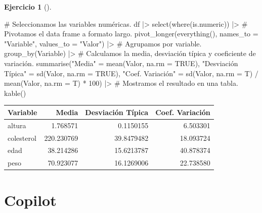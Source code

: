 \documentclass[
  a4paper,
]{scrreport}
\newenvironment{Shaded}{\begin{snugshade}}{\end{snugshade}}
\newcommand{\AttributeTok}[1]{\textcolor[rgb]{0.40,0.45,0.13}{#1}}
\newcommand{\CommentTok}[1]{\textcolor[rgb]{0.37,0.37,0.37}{#1}}
\newcommand{\ConstantTok}[1]{\textcolor[rgb]{0.56,0.35,0.01}{#1}}
\newcommand{\DecValTok}[1]{\textcolor[rgb]{0.68,0.00,0.00}{#1}}
\newcommand{\FunctionTok}[1]{\textcolor[rgb]{0.28,0.35,0.67}{#1}}
\newcommand{\NormalTok}[1]{\textcolor[rgb]{0.00,0.23,0.31}{#1}}
\newcommand{\OtherTok}[1]{\textcolor[rgb]{0.00,0.23,0.31}{#1}}
\newcommand{\SpecialCharTok}[1]{\textcolor[rgb]{0.37,0.37,0.37}{#1}}
\newcommand{\StringTok}[1]{\textcolor[rgb]{0.13,0.47,0.30}{#1}}
\theoremstyle{definition}
\newtheorem{exercise}{Ejercicio}[chapter]
\theoremstyle{remark}
\begin{document}
\begin{exercise}[]
\begin{enumerate}
\begin{tcolorbox}
\begin{Shaded}
\begin{Highlighting}[]
\CommentTok{\# Seleccionamos las variables numéricas.}
\NormalTok{df }\SpecialCharTok{|\textgreater{}} \FunctionTok{select}\NormalTok{(}\FunctionTok{where}\NormalTok{(is.numeric)) }\SpecialCharTok{|\textgreater{}}
    \CommentTok{\# Pivotamos el data frame a formato largo.}
    \FunctionTok{pivot\_longer}\NormalTok{(}\FunctionTok{everything}\NormalTok{(), }\AttributeTok{names\_to =} \StringTok{"Variable"}\NormalTok{, }\AttributeTok{values\_to =} \StringTok{"Valor"}\NormalTok{) }\SpecialCharTok{|\textgreater{}}
    \CommentTok{\# Agrupamos por variable.}
    \FunctionTok{group\_by}\NormalTok{(Variable) }\SpecialCharTok{|\textgreater{}}
    \CommentTok{\# Calculamos la media, desviación típica y coeficiente de variación.}
    \FunctionTok{summarise}\NormalTok{(}\StringTok{"Media"} \OtherTok{=} \FunctionTok{mean}\NormalTok{(Valor, }\AttributeTok{na.rm =} \ConstantTok{TRUE}\NormalTok{), }
    \StringTok{"Desviación Típica"} \OtherTok{=} \FunctionTok{sd}\NormalTok{(Valor, }\AttributeTok{na.rm =} \ConstantTok{TRUE}\NormalTok{),}
    \StringTok{"Coef. Variación"} \OtherTok{=} \FunctionTok{sd}\NormalTok{(Valor, }\AttributeTok{na.rm =}\NormalTok{ T) }\SpecialCharTok{/} \FunctionTok{mean}\NormalTok{(Valor, }\AttributeTok{na.rm =}\NormalTok{ T) }\SpecialCharTok{*} \DecValTok{100}\NormalTok{) }\SpecialCharTok{|\textgreater{}}
    \CommentTok{\# Mostramos el resultado en una tabla.}
    \FunctionTok{kable}\NormalTok{()}
\end{Highlighting}
\end{Shaded}

  \begin{longtable}[]{@{}lrrr@{}}
  \toprule\noalign{}
  Variable & Media & Desviación Típica & Coef. Variación \\
  \midrule\noalign{}
  \endhead
  \bottomrule\noalign{}
  \endlastfoot
  altura & 1.768571 & 0.1150155 & 6.503301 \\
  colesterol & 220.230769 & 39.8479482 & 18.093724 \\
  edad & 38.214286 & 15.6213787 & 40.878374 \\
  peso & 70.923077 & 16.1269006 & 22.738580 \\
  \end{longtable}

  \section{Copilot}


\end{tcolorbox}
\end{enumerate}
\end{exercise}
\end{document}
